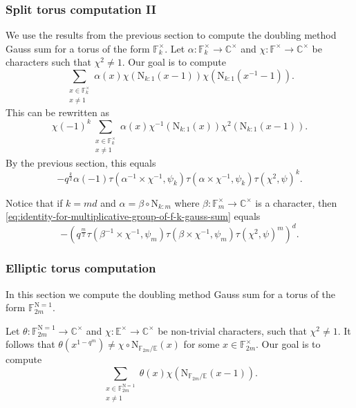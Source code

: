 \documentclass[12pt, reqno]{amsart}
\theoremstyle{definition}
\theoremstyle{definition}
\theoremstyle{definition}
\newcommand{\cComplex}{\mathbb{C}}
\newcommand{\multiplicativegroup}[1]{#1^{\times}}
\newcommand{\fieldCharacter}{\psi}
\newcommand{\FieldNorm}[2]{\mathrm{N}_{#1:#2}}
\newcommand{\aFieldNorm}{\mathrm{N}}
\newcommand{\finiteField}{\mathbb{F}}
\newcommand{\quadraticExtension}{\mathbb{E}}
\newcommand{\finiteFieldExtension}[1]{\finiteField_{#1}}
\newcommand{\NormOneGroup}[1]{\finiteFieldExtension{#1}^{\aFieldNorm = 1}}
\newcommand{\GaussSumCharacter}[3]{\tau\left(#1 \times #2, #3\right)}
\begin{document}
\subsubsection{Split torus computation II}
We use the results from the previous section to compute the doubling method Gauss sum for a torus of the form $\multiplicativegroup{\finiteFieldExtension{k}}$. Let $\alpha \colon \multiplicativegroup{\finiteFieldExtension{k}} \to \multiplicativegroup{\cComplex}$ and $\chi \colon \multiplicativegroup{\finiteField} \to \multiplicativegroup{\cComplex}$ be characters such that $\chi^2 \ne 1$. Our goal is to compute $$\sum_{\substack{x \in \multiplicativegroup{\finiteFieldExtension{k}}\\
		x \ne 1}} \alpha \left(x\right) \chi\left(\FieldNorm{k}{1}\left(x - 1\right)\right) \chi\left(\FieldNorm{k}{1}\left(x^{-1} - 1\right)\right).$$
This can be rewritten as
$$\chi\left(-1\right)^k \sum_{\substack{x \in \multiplicativegroup{\finiteFieldExtension{k}}\\
		x \ne 1}} \alpha \left(x\right) \chi^{-1}\left(\FieldNorm{k}{1}\left(x\right)\right) \chi^2\left(\FieldNorm{k}{1}\left(x - 1\right)\right).$$
By the previous section, this equals
\begin{equation}\label{eq:identity-for-multiplicative-group-of-f-k-gauss-sum}
	-q^{\frac{k}{2}} \alpha\left(-1\right)  \GaussSumCharacter{\alpha^{-1}}{\chi^{-1}}{\fieldCharacter_k} \GaussSumCharacter{\alpha}{\chi^{-1}}{\fieldCharacter_k} \tau\left(\chi^2, \fieldCharacter\right)^k.
\end{equation}

Notice that if $k = md$ and $\alpha = \beta \circ \FieldNorm{k}{m}$ where $\beta \colon \multiplicativegroup{\finiteFieldExtension{m}} \to \multiplicativegroup{\cComplex}$ is a character, then \eqref{eq:identity-for-multiplicative-group-of-f-k-gauss-sum} equals
$$-\left(q^{\frac{m}{2}} \GaussSumCharacter{\beta^{-1}}{\chi^{-1}}{\fieldCharacter_m} \GaussSumCharacter{\beta}{\chi^{-1}}{\fieldCharacter_m} \tau\left(\chi^2, \fieldCharacter\right)^m\right)^{d}.$$

\subsubsection{Elliptic torus computation}
In this section we compute the doubling method Gauss sum for a torus of the form $\NormOneGroup{2m}$.

Let $\theta \colon \NormOneGroup{2m} \to \multiplicativegroup{\cComplex}$ and $\chi \colon \multiplicativegroup{\quadraticExtension} \to \multiplicativegroup{\cComplex}$ be non-trivial characters, such that $\chi^2 \ne 1$. It follows that $\theta\left(x^{1-q^m}\right) \ne \chi \circ \aFieldNorm_{\finiteFieldExtension{2m} \slash \quadraticExtension}\left(x\right)$ for some $x \in \multiplicativegroup{\finiteFieldExtension{2m}}$. Our goal is to compute $$\sum_{\substack{x \in \NormOneGroup{2m}\\
		x \ne 1}} \theta \left(x\right) \chi\left(\aFieldNorm_{\finiteFieldExtension{2m} \slash \quadraticExtension}\left(x - 1\right)\right).$$
\end{document}
